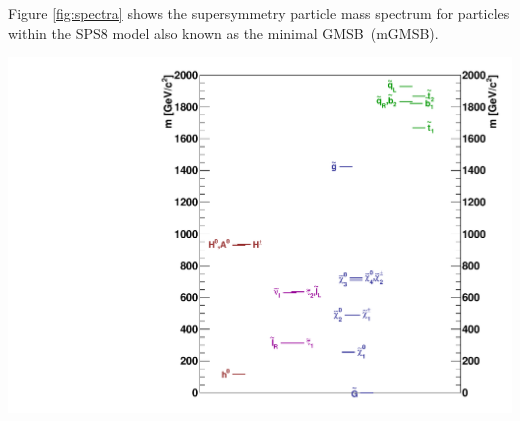 Figure \ref{fig:spectra} shows the supersymmetry particle mass spectrum for particles within the SPS8 model also known as the minimal GMSB~(mGMSB). 
\begin{center}
\centering
\includegraphics[scale=0.35]{THESISPLOTS/gmsb_Lambda180_CTau10000.pdf}  
\label{fig:spectra}
\end{center}

